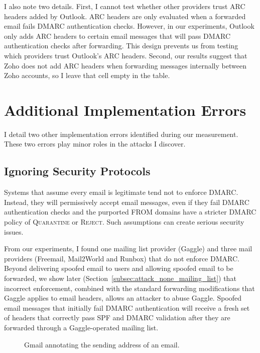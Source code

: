 I also note two details.
First, I cannot test whether other providers trust ARC headers added by Outlook. ARC headers are only evaluated when a forwarded email fails DMARC authentication checks.
However, in our experiments, Outlook only adds ARC headers to certain email messages that will pass DMARC authentication checks after forwarding.
This design prevents us from testing which providers trust Outlook's ARC headers.
Second, our results suggest that Zoho does not add ARC headers when forwarding messages internally between Zoho accounts, so I leave that cell empty in the table.

\section{Additional Implementation Errors}
\label{sec:implementation_errors_additional}
I detail two other implementation errors identified during our measurement. These two errors play minor roles in the attacks I discover.
\subsection{Ignoring Security Protocols}
\label{subsec:no_dmarc}
Systems that assume every email is legitimate tend not to enforce DMARC. Instead, they will permissively accept
email messages, even if they fail DMARC authentication checks and the
purported FROM domains have a stricter DMARC policy of \textsc{Quarantine} or
\textsc{Reject}. Such assumptions can create serious security issues.

From our experiments, I found
one mailing list provider (Gaggle) and three mail providers (Freemail, Mail2World and Runbox) that do not enforce
DMARC.
Beyond delivering spoofed email to users and allowing spoofed email to be forwarded, we
show later (Section~\ref{subsec:attack_none_mailing_list}) that
incorrect enforcement, combined with the standard forwarding
modifications that Gaggle applies to email headers, allows an attacker
to abuse Gaggle. Spoofed email messages that initially fail
DMARC authentication will receive a fresh set of headers that
correctly pass SPF and DMARC validation after they are forwarded
through a Gaggle-operated mailing list.

\begin{figure}[t]
  \centering
{
    \setlength{\fboxsep}{0pt}
    \setlength{\fboxrule}{0.5pt}
}
  \caption{Gmail annotating the sending address of an email. 
}
\label{fig:gmail_via}
\end{figure}

